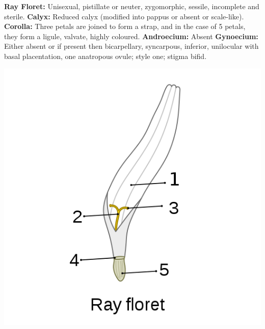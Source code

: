 \documentclass{article}
\begin{document}
\text{ }\newline
\textbf{Ray Floret:} Unisexual, pistillate or neuter, zygomorphic, sessile, incomplete and sterile.\newline
\textbf{Calyx:} Reduced calyx (modified into pappus or absent or scale-like).\newline
\textbf{Corolla:}  Three petals are joined to form a strap, and in the case of 5 petals, they form a ligule, valvate, highly coloured.\newline
\textbf{Androecium:} Absent\newline
\textbf{Gynoecium:} Either absent or if present then bicarpellary, syncarpous, inferior, unilocular with basal placentation, one anatropous ovule; style one; stigma bifid.
\begin{center}
    \includegraphics[scale=0.45]{images/2.png}
\end{center}
\end{document}
